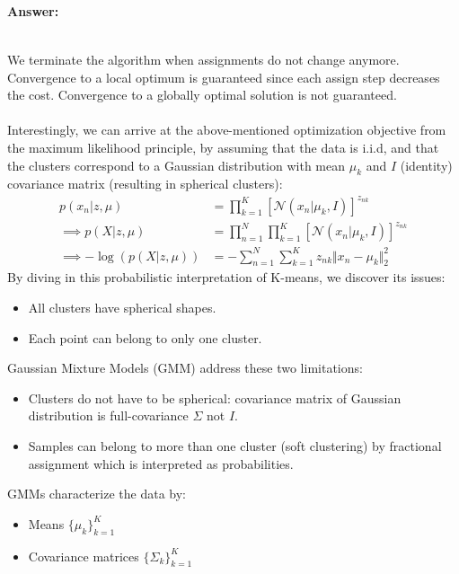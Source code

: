 \documentclass{article}
\newenvironment{QandA}{\begin{enumerate}[label=\arabic*.]}{\end{enumerate}}
\newenvironment{InnerQandA}{\begin{enumerate}[label=\roman*.]}{\end{enumerate}}
\newenvironment{answer}{\par\normalfont \textbf{Answer:}}{}
\newcommand{\g}{\vert}
\begin{document}
\begin{QandA}
\begin{InnerQandA}
\begin{answer}
\begin{enumerate}[label=\arabic*.]
\begin{align*}
            \end{align*}
            \end{enumerate}
            We terminate the algorithm when assignments do not change anymore. Convergence to a local optimum is guaranteed since each assign step decreases the cost. Convergence to a globally optimal solution is not guaranteed. \\\\
            Interestingly, we can arrive at the above-mentioned optimization objective from the maximum likelihood principle, by assuming that the data is i.i.d, and that the clusters correspond to a Gaussian distribution with mean $\mu_k$ and $I$ (identity) covariance matrix (resulting in spherical clusters):
            \begin{align*}
                p(x_n \g z, \mu) &= \prod_{k=1}^K \left[ \mathcal{N}(x_n \g \mu_k, I) \right]^{z_{nk}}\\
                \implies p(X \g z, \mu) &= \prod_{n=1}^N \prod_{k=1}^K \left[ \mathcal{N}(x_n \g \mu_k, I) \right]^{z_{nk}} \\
                \implies -\log(p(X \g z, \mu)) &= - \sum_{n=1}^N\sum_{k=1}^K z_{nk} \Vert x_n - \mu_k \Vert^2_2
            \end{align*}
            By diving in this probabilistic interpretation of K-means, we discover its issues:
            \begin{itemize}
                \item All clusters have spherical shapes.
                \item Each point can belong to only one cluster.
            \end{itemize}
            Gaussian Mixture Models (GMM) address these two limitations:
            \begin{itemize}
                \item Clusters do not have to be spherical: covariance matrix of Gaussian distribution is full-covariance $\Sigma$ not $I$.
                \item Samples can belong to more than one cluster (soft clustering) by fractional assignment which is interpreted as probabilities.
            \end{itemize}
            GMMs characterize the data by:
            \begin{itemize}
                \item Means $\{\mu_k\}_{k=1}^K$ 
                \item Covariance matrices $\{\Sigma_k\}_{k=1}^K$ 

\end{itemize}
\end{answer}
\end{InnerQandA}
\end{QandA}
\end{document}
